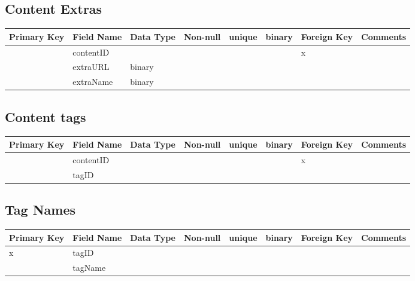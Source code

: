 \documentclass{article}
\begin{document}
\subsection{Content Extras}
\begin{tabular}{|m{1cm} | m{2cm} | m{1.5cm}| m{1cm} | m{1cm}| m{1cm} | m{1cm}| m{4cm}| }
  \hline
  Primary Key & Field Name & Data Type & Non-null & unique & binary & Foreign Key & Comments\\ 
  \hline
   & contentID & & & & & x &\\
  \hline
   & extraURL & binary & & & & &\\
  \hline
   & extraName & binary & & & & &\\
  \hline
\end{tabular}

\subsection{Content tags}
\begin{tabular}{|m{1cm} | m{2cm} | m{1.5cm}| m{1cm} | m{1cm}| m{1cm} | m{1cm}| m{4cm}| }
  \hline
  Primary Key & Field Name & Data Type & Non-null & unique & binary & Foreign Key & Comments\\ 
  \hline
   & contentID & & & & & x &\\
  \hline
   & tagID & & & & & &\\
  \hline
\end{tabular}

\subsection{Tag Names}
\begin{tabular}{|m{1cm} | m{2cm} | m{1.5cm}| m{1cm} | m{1cm}| m{1cm} | m{1cm}| m{4cm}| }
  \hline
  Primary Key & Field Name & Data Type & Non-null & unique & binary & Foreign Key & Comments\\ 
  \hline
  x & tagID & & & & & &\\
  \hline
   & tagName & & & & & &\\
  \hline
\end{tabular}
\end{document}
